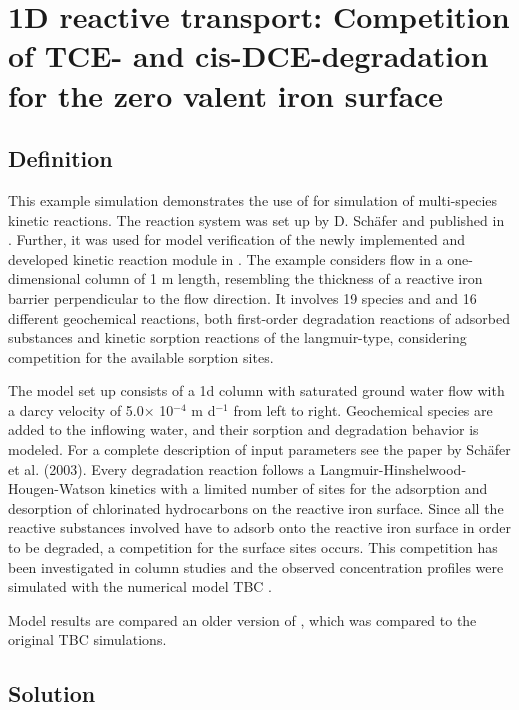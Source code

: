 \section[TCE- and cis-DCE-degradation for zero valent iron surface (1D)]{1D reactive transport: Competition of TCE- and cis-DCE-degradation for the zero valent iron surface}
\label{l_s_benchmark_1d_TCEonIon}

\subsection{Definition}
This example simulation demonstrates the use of \GeoSys for simulation of multi-species kinetic reactions. The reaction system was set up by D. {Sch\"afer} and published in \cite{Schaefer:2003}. Further, it was used for model verification of the newly implemented and developed kinetic reaction module in \GeoSys. The example considers flow in a one-dimensional column of 1 m length, resembling the thickness of a reactive iron barrier perpendicular to the flow direction. It involves 19 species and and 16 different geochemical reactions, both first-order degradation reactions of adsorbed substances and kinetic sorption reactions of the langmuir-type, considering competition for the available sorption sites.

The model set up consists of a 1d column with saturated ground water flow with a darcy velocity of 5.0$\times$ 10$^{-4}$ m d$^{-1}$ from left to right. Geochemical species are added to the inflowing water, and their sorption and degradation behavior is modeled. For a complete description of input parameters see the paper by {Sch\"afer} et al. (2003). Every degradation reaction follows a Langmuir-Hinshelwood-Hougen-Watson kinetics with a limited number of sites for the adsorption and desorption of chlorinated hydrocarbons on the reactive iron surface. Since all the reactive substances involved have to adsorb onto the reactive iron surface in order to be degraded, a competition for the surface sites occurs. This competition has been investigated in column studies and the observed concentration profiles were simulated with the numerical model TBC \cite{Schaefer:2003}.

Model results are compared an older version of \GeoSys, which was compared to the original TBC simulations.

\subsection{Solution}

